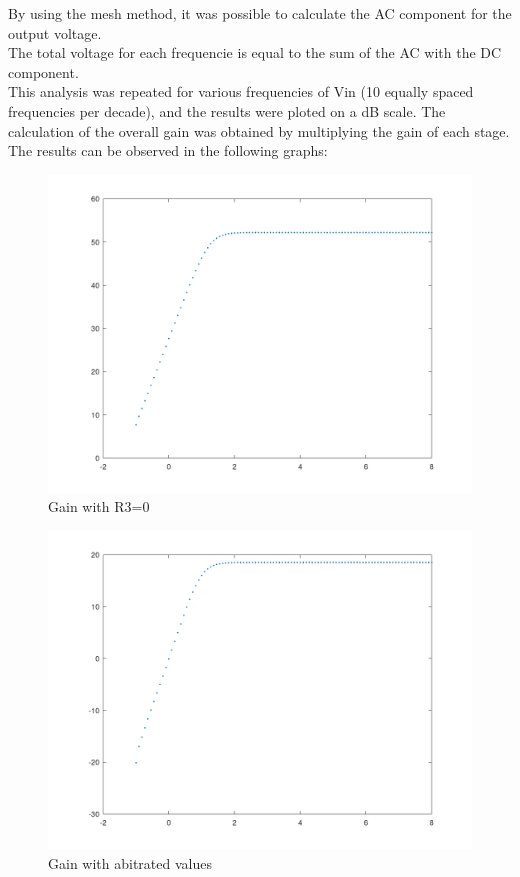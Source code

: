 \FloatBarrier

By using the mesh method, it was possible to calculate the AC component for the output voltage.\\
The total voltage for each frequencie is equal to the sum of the AC with the DC component.\\

This analysis was repeated for various frequencies of Vin (10 equally spaced frequencies per decade), and the results were ploted on a dB scale.
The calculation of the overall gain was obtained by multiplying the gain of each stage. The results can be observed in the following graphs:\\ 



\begin{figure} [!htb] 
  \includegraphics[width=\linewidth]{GAINVERDADEIRO.png}
  \caption{Gain with R3=0}
  \label{fig:theoplots}
  \endminipage\hfill
\end{figure}


\begin{figure} [!htb] 
  \includegraphics[width=\linewidth]{GAIN_Exprimental_R3_a_0.png}
  \caption{Gain with abitrated values}
  \label{fig:theoplots}
  \endminipage\hfill
\end{figure}

\FloatBarrier




